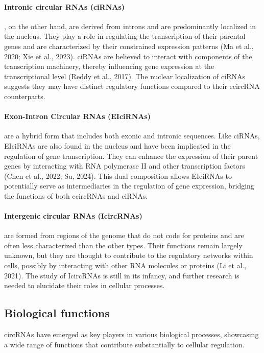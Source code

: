 \paragraph{Intronic circular RNAs (ciRNAs)}, on the other hand, are derived from introns
and are predominantly localized in the nucleus. They play a role in regulating
the transcription of their parental genes and are characterized by their
constrained expression patterns (Ma et al., 2020; Xie et al., 2023). ciRNAs are
believed to interact with components of the transcription machinery, thereby
influencing gene expression at the transcriptional level (Reddy et al., 2017).
The nuclear localization of ciRNAs suggests they may have distinct regulatory
functions compared to their ecircRNA counterparts.

\paragraph{Exon-Intron Circular RNAs (EIciRNAs)} are a hybrid form that includes both
exonic and intronic sequences. Like ciRNAs, EIciRNAs are also found in the
nucleus and have been implicated in the regulation of gene transcription. They
can enhance the expression of their parent genes by interacting with RNA
polymerase II and other transcription factors (Chen et al., 2022; Su, 2024).
This dual composition allows EIciRNAs to potentially serve as intermediaries in
the regulation of gene expression, bridging the functions of both ecircRNAs and
ciRNAs.

\paragraph{Intergenic circular RNAs (IcircRNAs)} are formed from regions of the genome
that do not code for proteins and are often less characterized than the other
types. Their functions remain largely unknown, but they are thought to
contribute to the regulatory networks within cells, possibly by interacting with
other RNA molecules or proteins (Li et al., 2021). The study of IcircRNAs is
still in its infancy, and further research is needed to elucidate their roles in
cellular processes.

\subsection{Biological functions}
circRNAs have emerged as key players in various biological processes, showcasing
a wide range of functions that contribute substantially to cellular regulation.

